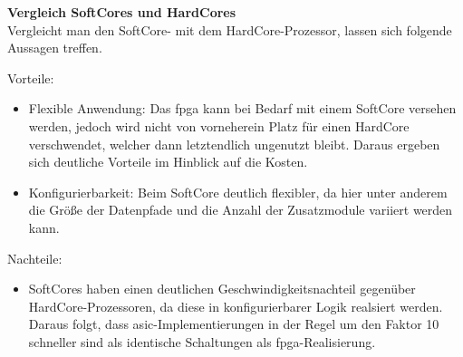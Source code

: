 \textbf{Vergleich SoftCores und HardCores}\\
Vergleicht man den SoftCore- mit dem HardCore-Prozessor, lassen sich folgende Aussagen treffen.

Vorteile:
\begin{itemize}
   \item Flexible Anwendung: Das \ac{fpga} kann bei Bedarf mit einem SoftCore versehen werden, jedoch wird nicht von vorneherein Platz für einen HardCore verschwendet, welcher
    dann letztendlich ungenutzt bleibt. Daraus ergeben sich deutliche Vorteile im Hinblick auf die Kosten.
    \item Konfigurierbarkeit: Beim SoftCore deutlich flexibler, da hier unter anderem die Größe der Datenpfade und die Anzahl der Zusatzmodule variiert werden kann.
 \end{itemize}


Nachteile:
\begin{itemize}
  \item SoftCores haben einen deutlichen Geschwindigkeitsnachteil gegenüber HardCore-Prozessoren, da diese in konfigurierbarer Logik realsiert werden. Daraus folgt, dass
        \ac{asic}-Implementierungen in der Regel um den Faktor 10 schneller sind als identische Schaltungen als \ac{fpga}-Realisierung.
\end{itemize}

